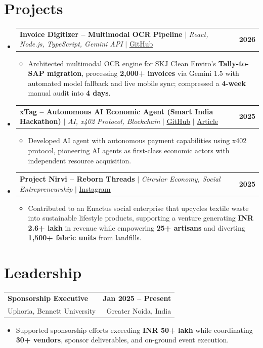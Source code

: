 \documentclass[letterpaper,10pt]{article}
\makeatletter
\newcommand{\resumeItem}[1]{
  \item\small{
    {#1 \vspace{1pt}}
  }
}
\newcommand{\resumeProjectHeading}[2]{
  \vspace{1pt}\item
  \begin{tabular*}{\textwidth}{l@{\extracolsep{\fill}}r}
    \small#1 & \textbf{\small #2}\\
  \end{tabular*}\vspace{0pt}
}
\newcommand{\resumeSubHeadingListStart}{\begin{itemize}[leftmargin=0.0in, label={}]}
\newcommand{\resumeSubHeadingListEnd}{\end{itemize}\vspace{0pt}}
\newcommand{\resumeItemListStart}{\begin{itemize}[leftmargin=0.18in, itemsep=0.5pt, parsep=0pt, topsep=1.5pt]}
\newcommand{\resumeItemListEnd}{\end{itemize}\vspace{0pt}}
\makeatother
\begin{document}
\vspace{-4pt}
\section{Projects}
\resumeSubHeadingListStart
  \resumeProjectHeading
    {\textbf{Invoice Digitizer -- Multimodal OCR Pipeline} $|$ \emph{React, Node.js, TypeScript, Gemini API} $|$ \href{https://github.com/MJforti/invoice-digitizer}{\underline{GitHub}}}{2026}
    \resumeItemListStart
      \resumeItem{Architected multimodal OCR engine for SKJ Clean Enviro's \textbf{Tally-to-SAP migration}, processing \textbf{2,000+ invoices} via Gemini 1.5 with automated model fallback and live mobile sync; compressed a \textbf{4-week} manual audit into \textbf{4 days}.}
    \resumeItemListEnd

  \resumeProjectHeading
    {\textbf{xTag -- Autonomous AI Economic Agent (Smart India Hackathon)} $|$ \emph{AI, x402 Protocol, Blockchain} $|$ \href{https://github.com/MJforti/xTag-v1-ETHGlobal}{\underline{GitHub}} $|$ \href{https://medium.com/@singanoop04/xtap-0b37bd04938c}{\underline{Article}}}{2025}
    \resumeItemListStart
      \resumeItem{Developed AI agent with autonomous payment capabilities using x402 protocol, pioneering AI agents as first-class economic actors with independent resource acquisition.}
    \resumeItemListEnd

  \resumeProjectHeading
    {\textbf{Project Nirvi -- Reborn Threads} $|$ \emph{Circular Economy, Social Entrepreneurship} $|$ \href{https://www.instagram.com/project.nirvi/}{\underline{Instagram}}}{2025}
    \resumeItemListStart
      \resumeItem{Contributed to an Enactus social enterprise that upcycles textile waste into sustainable lifestyle products, supporting a venture generating \textbf{INR 2.6+ lakh} in revenue while empowering \textbf{25+ artisans} and diverting \textbf{1,500+ fabric units} from landfills.}
    \resumeItemListEnd
\resumeSubHeadingListEnd

\vspace{-4pt}
\section{Leadership}
\small
\begin{tabularx}{\textwidth}{@{}Xr@{}}
  \textbf{Sponsorship Executive} & \textbf{Jan 2025 -- Present} \\
  Uphoria, Bennett University & Greater Noida, India
\end{tabularx}
\begin{itemize}[leftmargin=0.18in,itemsep=0.5pt,topsep=1.5pt]
  \item Supported sponsorship efforts exceeding \textbf{INR 50+ lakh} while coordinating \textbf{30+ vendors}, sponsor deliverables, and on-ground event execution.
\end{itemize}
\end{document}
